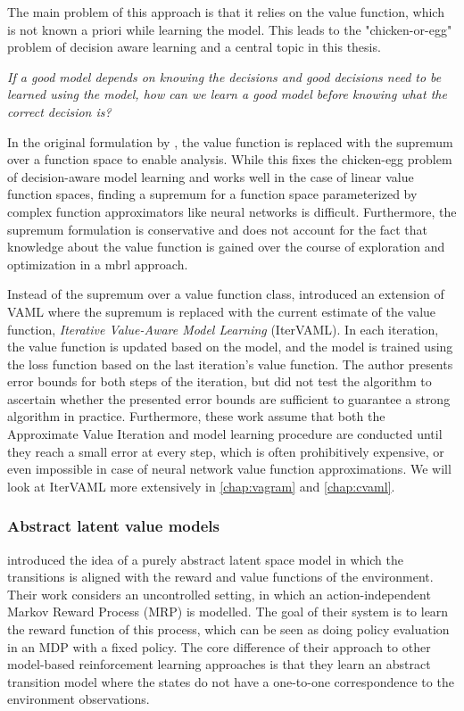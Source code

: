 The main problem of this approach is that it relies on the value function, which is not known a priori while learning the model. 
This leads to the "chicken-or-egg" problem of decision aware learning and a central topic in this thesis.

\forceindent \emph{If a good model depends on knowing the decisions and good decisions need to be learned using the model, how can we learn a good model before knowing what the correct decision is?}

In the original formulation by \textcite{vaml}, the value function is replaced with the supremum over a function space to enable analysis.
While this fixes the chicken-egg problem of decision-aware model learning and works well in the case of linear value function spaces, finding a supremum for a function space parameterized by complex function approximators like neural networks is difficult.
Furthermore, the supremum formulation is conservative and does not account for the fact that knowledge about the value function is gained over the course of exploration and optimization in a \ac{mbrl} approach.

Instead of the supremum over a value function class, \textcite{itervaml} introduced an extension of VAML where the supremum is replaced with the current estimate of the value function, \emph{Iterative Value-Aware Model Learning} (IterVAML).
In each iteration, the value function is updated based on the model, and the model is trained using the loss function based on the last iteration's value function.
The author presents error bounds for both steps of the iteration, but did not test the algorithm to ascertain whether the presented error bounds are sufficient to guarantee a strong algorithm in practice. 
Furthermore, these work assume that both the Approximate Value Iteration and model learning procedure are conducted until they reach a small error at every step, which is often prohibitively expensive, or even impossible in case of neural network value function approximations.
We will look at IterVAML more extensively in \autoref{chap:vagram} and \autoref{chap:cvaml}.


\subsubsection{Abstract latent value models}

\textcite{silver2017predictron} introduced the idea of a purely abstract latent space model in which the transitions is aligned with the reward and value functions of the environment.
Their work considers an uncontrolled setting, in which an action-independent Markov Reward Process (MRP) is modelled.
The goal of their system is to learn the reward function of this process, which can be seen as doing policy evaluation in an MDP with a fixed policy.
The core difference of their approach to other model-based reinforcement learning approaches is that they learn an abstract transition model where the states do not have a one-to-one correspondence to the environment observations.


